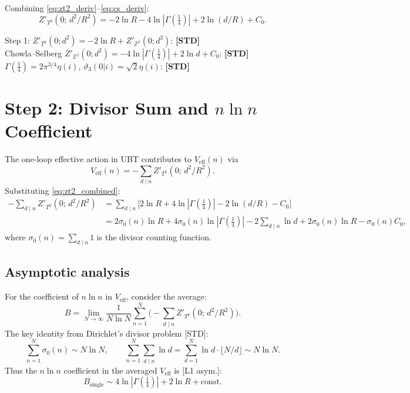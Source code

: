 \documentclass[12pt,a4paper]{article}
\begin{document}
Combining \eqref{eq:zt2_deriv}--\eqref{eq:cs_deriv}:
\begin{equation}
Z'_{T^2}(0;\, d^2/R^2)
= -2\ln R - 4\ln|\Gamma({\tfrac{1}{4}})| + 2\ln(d/R) + C_0.
\label{eq:zt2_combined}
\end{equation}

\begin{statusbox}
Step 1: $Z'_{T^2}(0; d^2) = -2\ln R + Z'_{\mathbb{Z}^2}(0; d^2)$: \textbf{[STD]}\\
Chowla--Selberg $Z'_{\mathbb{Z}^2}(0; d^2) = -4\ln|\Gamma(\tfrac14)| + 2\ln d + C_0$: \textbf{[STD]}\\
$\Gamma(\tfrac14) = 2\pi^{3/4}\eta(i)$, $\vartheta_3(0|i) = \sqrt{2}\eta(i)$: \textbf{[STD]}
\end{statusbox}

\section{Step 2: Divisor Sum and $n\ln n$ Coefficient}
\label{sec:step2}

The one-loop effective action in UBT contributes to $V_{\mathrm{eff}}(n)$ via
\begin{equation}
V_{\mathrm{eff}}(n)
= -\sum_{d\mid n} Z'_{T^2}(0;\, d^2/R^2).
\label{eq:veff_divisor}
\end{equation}
Substituting \eqref{eq:zt2_combined}:
\begin{align}
-\sum_{d\mid n} Z'_{T^2}(0;\, d^2/R^2)
&= \sum_{d\mid n}\bigl[2\ln R + 4\ln|\Gamma({\tfrac14})| - 2\ln(d/R) - C_0\bigr]
\nonumber\\
&= 2\sigma_0(n)\ln R
  + 4\sigma_0(n)\ln|\Gamma({\tfrac14})|
  - 2\sum_{d\mid n}\ln d
  + 2\sigma_0(n)\ln R
  - \sigma_0(n) C_0,
\label{eq:veff_expanded}
\end{align}
where $\sigma_0(n) = \sum_{d\mid n} 1$ is the divisor counting function.

\subsection*{Asymptotic analysis}

For the coefficient of $n\ln n$ in $V_{\mathrm{eff}}$, consider the average:
\[
B = \lim_{N\to\infty}
    \frac{1}{N\ln N}
    \sum_{n=1}^N
    \biggl(-\sum_{d\mid n} Z'_{T^2}(0;\,d^2/R^2)\biggr).
\]
The key identity from Dirichlet's divisor problem [STD]:
\[
\sum_{n=1}^N \sigma_0(n) \sim N\ln N,
\qquad
\sum_{n=1}^N \sum_{d\mid n} \ln d = \sum_{d=1}^N \ln d \cdot \lfloor N/d\rfloor
\sim N\ln N.
\]
Thus the $n\ln n$ coefficient in the averaged $V_{\mathrm{eff}}$ is [L1 asym.]:
\begin{equation}
B_{\mathrm{single}} \sim 4\ln|\Gamma({\tfrac14})| + 2\ln R + \text{const}.
\label{eq:b_single}
\end{equation}
\end{document}
